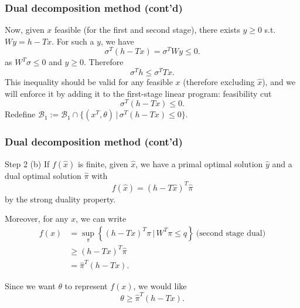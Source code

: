 \documentclass{beamer}
\begin{document}
\begin{frame}
\frametitle{Dual decomposition method (cont'd)}

Now, given $x$ feasible (for the first and second stage), there exists $y \geq 0$ s.t. $Wy = h-Tx$.
For such a $y$, we have
$$
\sigma^T(h-Tx) = \sigma^T W y \leq 0.
$$
as $W^T\sigma \leq 0$ and $y \geq 0$.
Therefore
\[
\sigma^Th \leq \sigma^TTx.
\]
This inequality should be valid for any feasible $x$ (therefore excluding $\hat{x}$), and we will enforce it by adding it to the first-stage linear program: {\red feasibility cut}
\[
\sigma^T(h-Tx) \leq 0.
\]
Redefine $\mathcal{B}_1 := \mathcal{B}_1 \cap \lbrace (x^T,
\theta) \,|\, \sigma^T(h-Tx) \leq 0 \rbrace$.

\end{frame}
	
	
	

\begin{frame}
\frametitle{Dual decomposition method (cont'd)}

{\red Step 2 (b)}
If $f(\hat{x})$ is finite, given $\hat{x}$, we have a primal optimal solution $\hat{y}$ and a dual optimal solution $\hat{\pi}$ with
\[
f(\hat{x}) = (h-T\hat{x})^T \hat{\pi}
\]
by the strong duality property.

\mbox{}

Moreover, for any $x$, we can write
\begin{align*}
f(x) &= \sup_{\pi} \left\lbrace (h-Tx)^T\pi \,|\, W^T\pi \leq q \right\rbrace \ \mbox{(second stage dual)}\\
&\geq (h-Tx)^T \hat{\pi} \\
&= \hat{\pi}^T(h-Tx).
\end{align*}

Since we want $\theta$ to represent $f(x)$, we would like
\[
\theta \geq \hat{\pi}^T(h-Tx).
\]

\end{frame}
\end{document}
